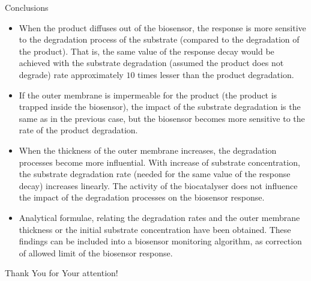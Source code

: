 \documentclass[hyperref={breaklinks=true},fleqn,mathserif]{beamer}
\begin{document}
\begin{frame}[shrink=21]{Conclusions}

\begin{block}{}
\begin{itemize}

\item
When the product diffuses out of the biosensor, the response is more sensitive to the degradation process of the substrate (compared to the degradation of the product).
That is, the same value of the response decay would be achieved with the substrate degradation (assumed the product does not degrade) rate approximately $10$ times lesser
than the product degradation.

\pause
\smallskip
\item
If the outer membrane is impermeable for the product (the product is trapped inside the biosensor), the impact of the substrate degradation is the same as in the previous case,
but the biosensor becomes more sensitive to the rate of the product degradation.

\pause
\smallskip
\item
When the thickness of the outer membrane increases, the degradation processes become more influential.
With increase of substrate concentration, the substrate degradation rate (needed for the same value of the response decay) increases linearly.
The activity of the biocatalyser does not influence the impact of the degradation processes on the biosensor response.

\pause
\smallskip
\item
Analytical formulae, relating the degradation rates and the outer membrane thickness or the initial substrate concentration have been obtained.
These findings can be included into a biosensor monitoring algorithm, as correction of allowed limit of the biosensor response.

\end{itemize}
\end{block}

\end{frame}

\begin{frame}{Thank You for Your attention!}


\end{frame}
\end{document}
